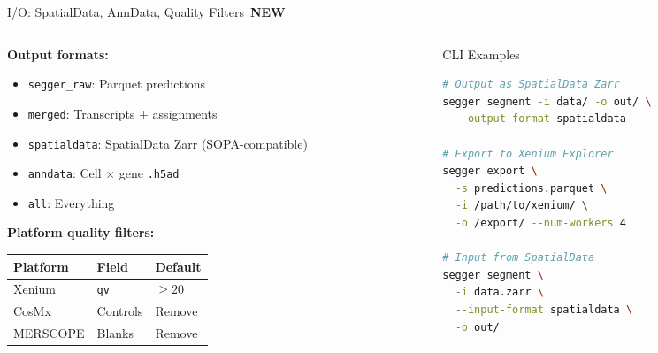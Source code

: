 \documentclass[aspectratio=169,10pt]{beamer}
\newcommand{\NEW}{\,{\scriptsize\colorbox{newgreen}{\color{white}\textbf{NEW}}}\,}
\begin{document}
\begin{frame}[fragile]{I/O: SpatialData, AnnData, Quality Filters \NEW}

\begin{columns}[T]
\begin{column}{0.48\textwidth}
\textbf{Output formats:}
{\small
\begin{itemize}\setlength\itemsep{1pt}
  \item \texttt{segger\_raw}: Parquet predictions
  \item \texttt{merged}: Transcripts + assignments
  \item \texttt{spatialdata}: SpatialData Zarr (SOPA-compatible)
  \item \texttt{anndata}: Cell $\times$ gene \texttt{.h5ad}
  \item \texttt{all}: Everything
\end{itemize}
}

\vspace{0.1cm}
\textbf{Platform quality filters:}

{\scriptsize
\begin{tabular}{@{}lll@{}}
\textbf{Platform} & \textbf{Field} & \textbf{Default} \\
\midrule
Xenium & \texttt{qv} & $\geq 20$ \\
CosMx & Controls & Remove \\
MERSCOPE & Blanks & Remove \\
\end{tabular}
}
\end{column}

\begin{column}{0.48\textwidth}
\begin{exampleblock}{CLI Examples}
\begin{lstlisting}[language=bash]
# Output as SpatialData Zarr
segger segment -i data/ -o out/ \
  --output-format spatialdata

# Export to Xenium Explorer
segger export \
  -s predictions.parquet \
  -i /path/to/xenium/ \
  -o /export/ --num-workers 4

# Input from SpatialData
segger segment \
  -i data.zarr \
  --input-format spatialdata \
  -o out/
\end{lstlisting}
\end{exampleblock}
\end{column}
\end{columns}
\end{frame}

\end{document}
